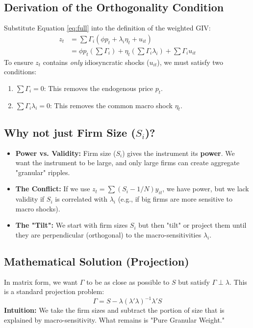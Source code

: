 \documentclass[12pt]{article}
\begin{document}
\subsection{Derivation of the Orthogonality Condition}
Substitute Equation \ref{eq:full} into the definition of the weighted GIV:
\begin{align*}
    z_t & = \sum \Gamma_i (\phi p_t + \lambda_i \eta_t + u_{it})                               \\
        & = \phi p_t (\sum \Gamma_i) + \eta_t (\sum \Gamma_i \lambda_i) + \sum \Gamma_i u_{it}
\end{align*}
To ensure $z_t$ contains \textit{only} idiosyncratic shocks ($u_{it}$), we must satisfy two conditions:
\begin{enumerate}
    \item $\sum \Gamma_i = 0$: This removes the endogenous price $p_t$.
    \item $\sum \Gamma_i \lambda_i = 0$: This removes the common macro shock $\eta_t$.
\end{enumerate}

\subsection{Why not just Firm Size ($S_i$)?}
\begin{itemize}
    \item \textbf{Power vs. Validity:} Firm size ($S_i$) gives the instrument its \textbf{power}. We want the instrument to be large, and only large firms can create aggregate "granular" ripples.
    \item \textbf{The Conflict:} If we use $z_t = \sum (S_i - 1/N) y_{it}$, we have power, but we lack validity if $S_i$ is correlated with $\lambda_i$ (e.g., if big firms are more sensitive to macro shocks).
    \item \textbf{The "Tilt":} We start with firm sizes $S_i$ but then "tilt" or project them until they are perpendicular (orthogonal) to the macro-sensitivities $\lambda_i$.
\end{itemize}

\subsection{Mathematical Solution (Projection)}
In matrix form, we want $\Gamma$ to be as close as possible to $S$ but satisfy $\Gamma \perp \lambda$. This is a standard projection problem:
\begin{equation}
    \Gamma = S - \lambda (\lambda' \lambda)^{-1} \lambda' S
\end{equation}
\textbf{Intuition:} We take the firm sizes and subtract the portion of size that is explained by macro-sensitivity. What remains is "Pure Granular Weight."
\end{document}
